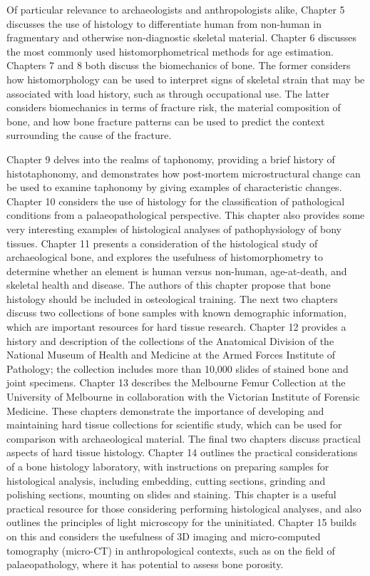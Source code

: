 \documentclass[%
	]{ijsra}
\begin{document}
Of particular relevance to archaeologists and anthropologists alike, Chapter 5 discusses the use of histology to differentiate human from non-human in fragmentary and otherwise non-diagnostic skeletal material. Chapter 6 discusses the most commonly used histomorphometrical methods for age estimation. Chapters 7 and 8 both discuss the biomechanics of bone. The former considers how histomorphology can be used to interpret signs of skeletal strain that may be associated with load history, such as through occupational use.  The latter considers biomechanics in terms of fracture risk, the material composition of bone, and how bone fracture patterns can be used to predict the context surrounding the cause of the fracture.

Chapter 9 delves into the realms of taphonomy, providing a brief history of histotaphonomy, and demonstrates how post-mortem microstructural change can be used to examine taphonomy by giving examples of characteristic changes. Chapter 10 considers the use of histology for the classification of pathological conditions from a palaeopathological perspective. This chapter also provides some very interesting examples of histological analyses of pathophysiology of bony tissues. Chapter 11 presents a consideration of the histological study of archaeological bone, and explores the usefulness of histomorphometry to determine whether an element is human versus non-human, age-at-death, and skeletal health and disease. The authors of this chapter propose that bone histology should be included in osteological training. 
The next two chapters discuss two collections of bone samples with known demographic information, which are important resources for hard tissue research. Chapter 12 provides a history and description of the collections of the Anatomical Division of the National Museum of Health and Medicine at the Armed Forces Institute of Pathology; the collection includes more than 10,000 slides of stained bone and joint specimens. Chapter 13 describes the Melbourne Femur Collection at the University of Melbourne in collaboration with the Victorian Institute of Forensic Medicine. These chapters demonstrate the importance of developing and maintaining hard tissue collections for scientific study, which can be used for comparison with archaeological material.
The final two chapters discuss practical aspects of hard tissue histology. Chapter 14 outlines the practical considerations of a bone histology laboratory, with instructions on preparing samples for histological analysis, including embedding, cutting sections, grinding and polishing sections, mounting on slides and staining. This chapter is a useful practical resource for those considering performing histological analyses, and also outlines the principles of light microscopy for the uninitiated. Chapter 15 builds on this and considers the usefulness of 3D imaging and micro-computed tomography (micro-CT) in anthropological contexts, such as on the field of palaeopathology, where it has potential to assess bone porosity. 
\end{document}

